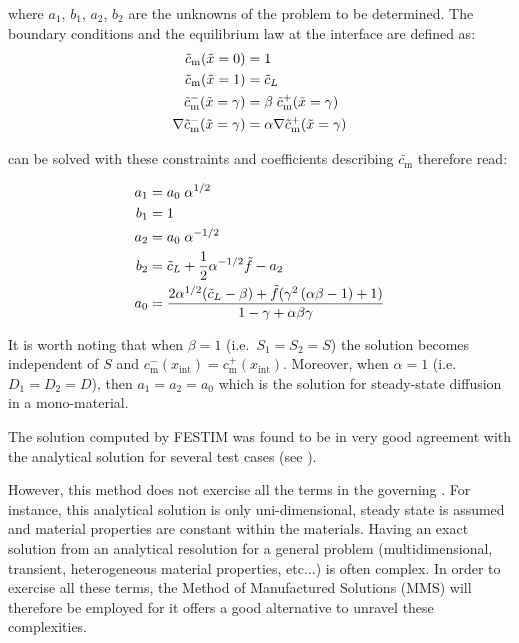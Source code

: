 where $a_1$, $b_1$, $a_2$, $b_2$ are the unknowns of the problem to be determined.
The boundary conditions and the equilibrium law at the interface are defined as:
\begin{subequations} \labeq{bcs MES}
\begin{align} 
        \tilde{c}_\mathrm{m}(\tilde{x}=0) & = 1 \\
        \tilde{c}_\mathrm{m}(\tilde{x}=1) & =  \tilde{c}_L \\
        \tilde{c}_\mathrm{m}^-(\tilde{x}=\gamma) & =  \beta \; \tilde{c}_\mathrm{m}^+(\tilde{x}=\gamma)\\
        \nabla \tilde{c}_\mathrm{m}^-(\tilde{x}=\gamma) & =  \alpha \nabla \tilde{c}_\mathrm{m}^+(\tilde{x}=\gamma)
\end{align}
\end{subequations}


 can be solved with these constraints and coefficients describing $\tilde{c_\mathrm{m}}$ therefore read:

\begin{align}
    \begin{split}
        a_1 &= a_0 \; \alpha^{1/2}  \\
        b_1 &= 1 \\
        a_2 &= a_0 \; \alpha^{-1/2}\\
        b_2 &= \tilde{c}_L + \frac{1}{2} \alpha^{-1/2} \tilde{f} - a_2 \\
        a_0 &= \frac{2 \alpha^{1/2}( \tilde{c}_L - \beta) + \tilde{f}  (\gamma^{2} \left(\alpha \beta - 1\right) + 1)}{1  - \gamma + \alpha \beta \gamma} \\
    \end{split}
    \labeq{MES c coefficients}
\end{align}

It is worth noting that when $\beta=1$ (i.e.\ $S_1 = S_2 = S$) the solution becomes independent of $S$ and {$c_\mathrm{m}^{-}(x_\mathrm{int}) = c_\mathrm{m}^{+}(x_\mathrm{int})$}.
Moreover, when $\alpha = 1$ (i.e.\ $D_1 = D_2 = D$), then $a_1 = a_2 = a_0$ which is the solution for steady-state diffusion in a mono-material.

The solution computed by FESTIM was found to be in very good agreement with the analytical solution for several test cases (see ).

 
However, this method does not exercise all the terms in the governing .
For instance, this analytical solution is only uni-dimensional, steady state is assumed and material properties are constant within the materials.
Having an exact solution from an analytical resolution for a general problem (multidimensional, transient, heterogeneous material properties, etc...) is often complex.
In order to exercise all these terms, the Method of Manufactured Solutions (MMS) will therefore be employed for it offers a good alternative to unravel these complexities.

